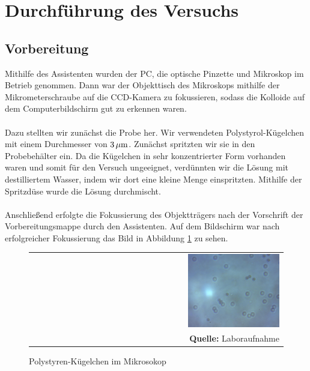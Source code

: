 \documentclass[a4paper,titlepage]{scrartcl}
\numberwithin{equation}{section}
\begin{document}
\section{Durchführung des Versuchs}
\subsection{Vorbereitung}
Mithilfe des Assistenten wurden der PC, die optische Pinzette und Mikroskop im Betrieb genommen. Dann war der Objekttisch des Mikroskops mithilfe der Mikrometerschraube auf die CCD-Kamera zu fokussieren, sodass die Kolloide auf dem Computerbildschirm gut zu erkennen waren.\\ \\
Dazu stellten wir zunächst die Probe her. Wir verwendeten Polystyrol-Kügelchen mit einem Durchmesser von $\unit[3]{\mu m}$. Zunächst spritzten wir sie in den Probebehälter ein.
Da die Kügelchen in sehr konzentrierter Form vorhanden waren und somit für den Versuch ungeeignet, verdünnten wir die Lösung mit destilliertem Wasser, indem wir dort eine kleine Menge einspritzten. Mithilfe der Spritzdüse wurde die Lösung durchmischt.\\ \\
Anschließend erfolgte die Fokussierung des Objektträgers nach der Vorschrift der Vorbereitungsmappe durch den Assistenten. Auf dem Bildschirm war nach erfolgreicher Fokussierung das Bild in Abbildung \ref{fig:laboraufnahme1} zu sehen.
\begin{figure}[H]
	\centering
	\begin{tabular}{@{}r@{}}
		\includegraphics[width=0.37\textwidth]{aufgabe3-2.jpg}\\
		\footnotesize\sffamily\textbf{Quelle:} Laboraufnahme
	\end{tabular}
	\caption{Polystyren-Kügelchen im Mikrosokop}
    \label{fig:laboraufnahme1}
\end{figure}
\end{document}
